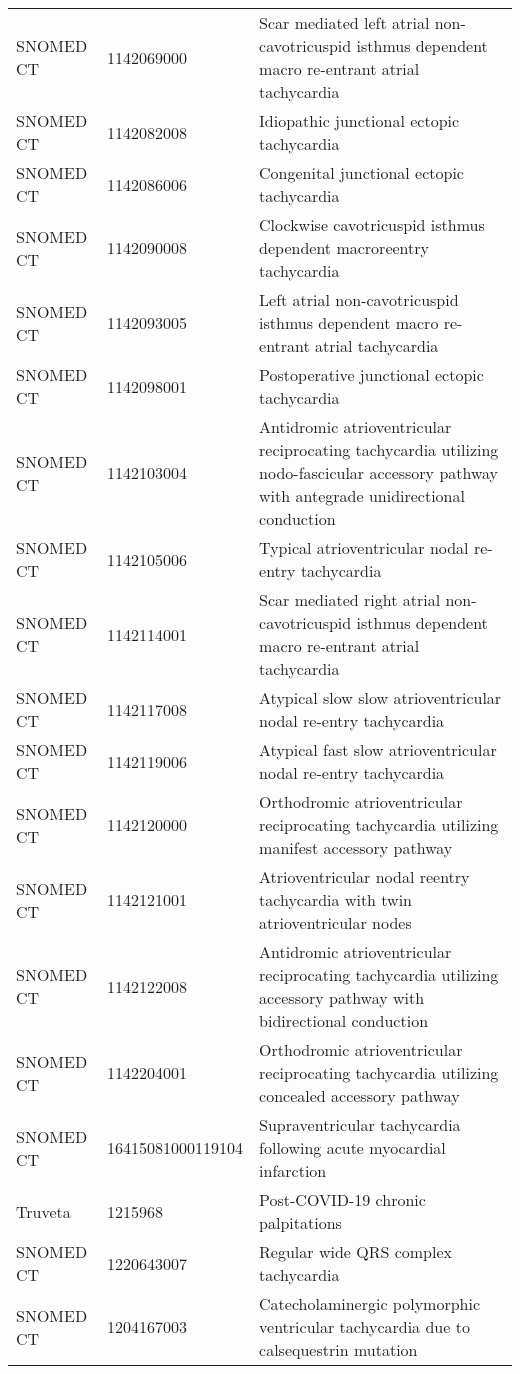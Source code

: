 \begin{longtable}{p{}p{}p{}}
  SNOMED CT & 1142069000 & Scar mediated left atrial non-cavotricuspid isthmus dependent macro re-entrant atrial tachycardia \\ 
  SNOMED CT & 1142082008 & Idiopathic junctional ectopic tachycardia \\ 
  SNOMED CT & 1142086006 & Congenital junctional ectopic tachycardia \\ 
  SNOMED CT & 1142090008 & Clockwise cavotricuspid isthmus dependent macroreentry tachycardia \\ 
  SNOMED CT & 1142093005 & Left atrial non-cavotricuspid isthmus dependent macro re-entrant atrial tachycardia \\ 
  SNOMED CT & 1142098001 & Postoperative junctional ectopic tachycardia \\ 
  SNOMED CT & 1142103004 & Antidromic atrioventricular reciprocating tachycardia utilizing nodo-fascicular accessory pathway with antegrade unidirectional conduction \\ 
  SNOMED CT & 1142105006 & Typical atrioventricular nodal re-entry tachycardia \\ 
  SNOMED CT & 1142114001 & Scar mediated right atrial non-cavotricuspid isthmus dependent macro re-entrant atrial tachycardia \\ 
  SNOMED CT & 1142117008 & Atypical slow slow atrioventricular nodal re-entry tachycardia \\ 
  SNOMED CT & 1142119006 & Atypical fast slow atrioventricular nodal re-entry tachycardia \\ 
  SNOMED CT & 1142120000 & Orthodromic atrioventricular reciprocating tachycardia utilizing manifest accessory pathway \\ 
  SNOMED CT & 1142121001 & Atrioventricular nodal reentry tachycardia with twin atrioventricular nodes \\ 
  SNOMED CT & 1142122008 & Antidromic atrioventricular reciprocating tachycardia utilizing accessory pathway with bidirectional conduction \\ 
  SNOMED CT & 1142204001 & Orthodromic atrioventricular reciprocating tachycardia utilizing concealed accessory pathway \\ 
  SNOMED CT & 16415081000119104 & Supraventricular tachycardia following acute myocardial infarction \\ 
  Truveta & 1215968 & Post-COVID-19 chronic palpitations \\ 
  SNOMED CT & 1220643007 & Regular wide QRS complex tachycardia \\ 
  SNOMED CT & 1204167003 & Catecholaminergic polymorphic ventricular tachycardia due to calsequestrin mutation \\ 

\end{longtable}
